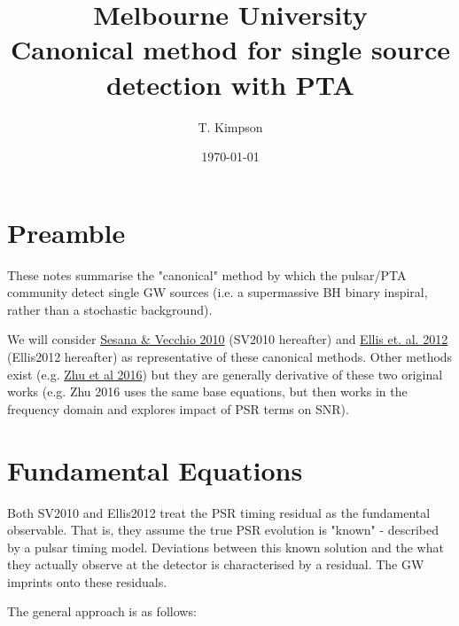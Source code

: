 \documentclass{tufte-handout} %
\title{	
	\normalfont\normalsize 
	{Melbourne University} \\ [0pt] %
	\huge Canonical method for single source detection with PTA%
}\author{T. Kimpson} %
\date{\vspace{-5pt}\normalsize\today} %
\begin{document}
\justifying 
\maketitle


\tableofcontents




\section{Preamble}
These notes summarise the "canonical" method by which the pulsar/PTA community detect single GW sources (i.e. a supermassive BH binary inspiral, rather than a stochastic background). \newline 

\noindent We will consider \href{https://arxiv.org/abs/1003.0677}{Sesana \& Vecchio 2010} (SV2010 hereafter) and \href{https://arxiv.org/abs/1204.4218}{Ellis et. al. 2012} (Ellis2012 hereafter) as representative of these canonical methods. Other methods exist (e.g. \href{https://ui.adsabs.harvard.edu/abs/2016MNRAS.461.1317Z/abstract}{Zhu et al 2016}) but they are generally derivative of these two original works (e.g. Zhu 2016 uses the same base equations, but then works in the frequency domain and explores impact of PSR terms on SNR). 



\section{Fundamental Equations}
Both SV2010 and Ellis2012 treat the PSR timing residual as the fundamental observable. That is, they assume the true PSR evolution is "known" - described by a pulsar timing model. Deviations between this known solution and the what they actually observe at the detector is characterised by a residual. The GW imprints onto these residuals. \newline 


\noindent The general approach is as follows:
\end{document}
